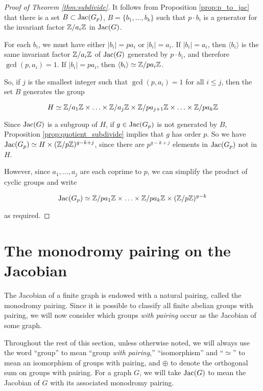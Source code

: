 \documentclass{amsart}
\begin{document}
\begin{proof}[Proof of Theorem \ref{thm:subdivide}]
  It follows from Proposition \ref{prop:p_to_jac} that there is a set
  $B \subset \operatorname{Jac}(G_p)$, $B = \{b_1, \ldots, b_k\}$ such that $p \cdot
  b_i$ is a generator for the invariant factor $\mathbb{Z}/a_i\mathbb{Z}$ in
  $\operatorname{Jac}(G)$.

  For each $b_i$, we must have either $|b_i| = pa_i$ or $|b_i| =
  a_i$. If $|b_i| = a_i$, then $\langle b_i \rangle$ is the same
  invariant factor $\mathbb{Z}/a_i\mathbb{Z}$ of $\operatorname{Jac}(G)$ generated by $p \cdot b_i$,
  and therefore $\gcd(p, a_i) = 1$. If $|b_i| = pa_i$, then $\langle
  b_i \rangle \simeq \mathbb{Z}/pa_i\mathbb{Z}$.

  So, if $j$ is the smallest integer such that $\gcd(p, a_i) = 1$ for
  all $i \le j$, then the set $B$ generates the group

  $$H \simeq \mathbb{Z}/a_1\mathbb{Z} \times \ldots \times \mathbb{Z}/a_j\mathbb{Z} 
  \times \mathbb{Z}/pa_{j+1}\mathbb{Z} \times \ldots \times \mathbb{Z}/pa_k\mathbb{Z}$$

  Since $\operatorname{Jac}(G)$ is a subgroup of $H$, if $g \in \operatorname{Jac}(G_p)$ is not
  generated by $B$, Proposition \ref{prop:quotient_subdivide} implies
  that $g$ has order $p$. So we have $\operatorname{Jac}(G_p) \simeq H \times
  (\mathbb{Z}/p\mathbb{Z})^{g-k+j}$, since there are $p^{g-k+j}$ elements in
  $\operatorname{Jac}(G_p)$ not in $H$.

  However, since $a_1, \ldots, a_j$ are each coprime to $p$, we can
  simplify the product of cyclic groups and write

\begin{equation*}
  \operatorname{Jac}(G_p) \simeq \mathbb{Z}/pa_1\mathbb{Z} \times 
  \ldots \times \mathbb{Z}/pa_k\mathbb{Z} \times (\mathbb{Z}/p\mathbb{Z})^{g-k}
\end{equation*}

as required.
\end{proof}

\section{The monodromy pairing on the Jacobian}


The Jacobian of a finite graph is endowed with a natural pairing,
called the monodromy pairing. Since it is possible to classify all
finite abelian groups with pairing, we will now consider which groups
\emph{with pairing} occur as the Jacobian of some graph.

\begin{note}
  Throughout the rest of this section, unless otherwise noted, we will
  always use the word ``group'' to mean ``group \emph{with pairing},''
  ``isomorphism'' and ``$\simeq$'' to mean an isomorphism of groups
  with pairing, and $\oplus$ to denote the orthogonal sum on groups
  with pairing. For a graph $G$, we will take $\operatorname{Jac}(G)$ to mean the
  Jacobian of $G$ with its associated monodromy pairing.
\end{note}
\end{document}
